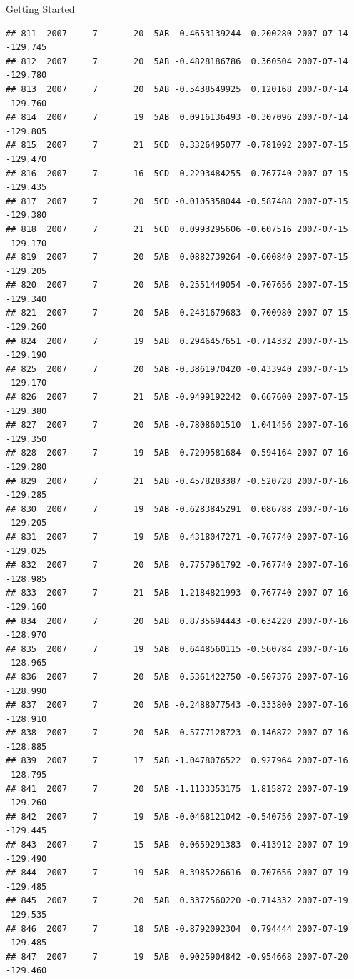 \documentclass[
  ignorenonframetext,
]{beamer}
\begin{document}
\begin{frame}[fragile]{Getting Started}
\begin{verbatim}
## 811  2007     7       20  5AB -0.4653139244  0.200280 2007-07-14 -129.745
## 812  2007     7       20  5AB -0.4828186786  0.360504 2007-07-14 -129.780
## 813  2007     7       20  5AB -0.5438549925  0.120168 2007-07-14 -129.760
## 814  2007     7       19  5AB  0.0916136493 -0.307096 2007-07-14 -129.805
## 815  2007     7       21  5CD  0.3326495077 -0.781092 2007-07-15 -129.470
## 816  2007     7       16  5CD  0.2293484255 -0.767740 2007-07-15 -129.435
## 817  2007     7       20  5CD -0.0105358044 -0.587488 2007-07-15 -129.380
## 818  2007     7       21  5CD  0.0993295606 -0.607516 2007-07-15 -129.170
## 819  2007     7       20  5AB  0.0882739264 -0.600840 2007-07-15 -129.205
## 820  2007     7       20  5AB  0.2551449054 -0.707656 2007-07-15 -129.340
## 821  2007     7       20  5AB  0.2431679683 -0.700980 2007-07-15 -129.260
## 824  2007     7       19  5AB  0.2946457651 -0.714332 2007-07-15 -129.190
## 825  2007     7       20  5AB -0.3861970420 -0.433940 2007-07-15 -129.170
## 826  2007     7       21  5AB -0.9499192242  0.667600 2007-07-15 -129.380
## 827  2007     7       20  5AB -0.7808601510  1.041456 2007-07-16 -129.350
## 828  2007     7       19  5AB -0.7299581684  0.594164 2007-07-16 -129.280
## 829  2007     7       21  5AB -0.4578283387 -0.520728 2007-07-16 -129.285
## 830  2007     7       19  5AB -0.6283845291  0.086788 2007-07-16 -129.205
## 831  2007     7       19  5AB  0.4318047271 -0.767740 2007-07-16 -129.025
## 832  2007     7       20  5AB  0.7757961792 -0.767740 2007-07-16 -128.985
## 833  2007     7       21  5AB  1.2184821993 -0.767740 2007-07-16 -129.160
## 834  2007     7       20  5AB  0.8735694443 -0.634220 2007-07-16 -128.970
## 835  2007     7       19  5AB  0.6448560115 -0.560784 2007-07-16 -128.965
## 836  2007     7       20  5AB  0.5361422750 -0.507376 2007-07-16 -128.990
## 837  2007     7       20  5AB -0.2488077543 -0.333800 2007-07-16 -128.910
## 838  2007     7       20  5AB -0.5777128723 -0.146872 2007-07-16 -128.885
## 839  2007     7       17  5AB -1.0478076522  0.927964 2007-07-16 -128.795
## 841  2007     7       20  5AB -1.1133353175  1.815872 2007-07-19 -129.260
## 842  2007     7       19  5AB -0.0468121042 -0.540756 2007-07-19 -129.445
## 843  2007     7       15  5AB -0.0659291383 -0.413912 2007-07-19 -129.490
## 844  2007     7       19  5AB  0.3985226616 -0.707656 2007-07-19 -129.485
## 845  2007     7       20  5AB  0.3372560220 -0.714332 2007-07-19 -129.535
## 846  2007     7       18  5AB -0.8792092304  0.794444 2007-07-19 -129.485
## 847  2007     7       19  5AB  0.9025904842 -0.954668 2007-07-20 -129.460

\end{verbatim}
\end{frame}
\end{document}
